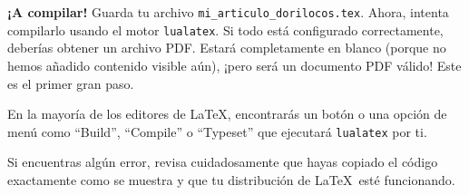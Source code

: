 \textbf{¡A compilar!}
Guarda tu archivo \texttt{mi\_articulo\_dorilocos.tex}.
Ahora, intenta compilarlo usando el motor \texttt{lualatex}.
Si todo está configurado correctamente, deberías obtener un archivo PDF.
Estará completamente en blanco (porque no hemos añadido contenido visible aún), ¡pero será un documento PDF válido!
Este es el primer gran paso.

En la mayoría de los editores de \LaTeX, encontrarás un botón o una opción de menú como ``Build'', ``Compile'' o ``Typeset'' que ejecutará \texttt{lualatex} por ti.

Si encuentras algún error, revisa cuidadosamente que hayas copiado el código exactamente como se muestra y que tu distribución de \LaTeX\ esté funcionando.
